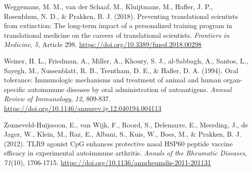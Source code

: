 \documentclass[authordate, editorial, issue]{jote-new-article}
\begin{document}
	Weggemans, M. M., van der Schaaf, M., Kluijtmans, M., Hafler, J. P., Rosenblum, N. D., \& Prakken, B. J. (2018). Preventing translational scientists from extinction: The long-term impact of a personalized training program in translational medicine on the careers of translational scientists. \emph{Frontiers in Medicine},\emph{ 5}, Article 298. \url{https://doi.org/10.3389/fmed.2018.00298}



	Weiner, H. L., Friedman, A., Miller, A., Khoury, S. J., al-Sabbagh, A., Santos, L., Sayegh, M., Nussenblatt, R. B., Trentham, D. E., \& Hafler, D. A. (1994). Oral tolerance: Immunologic mechanisms and treatment of animal and human organ-specific autoimmune diseases by oral administration of autoantigens. \emph{Annual Review of Immunology},\emph{ 12}, 809-837. \url{https://doi.org/10.1146/annurev.iy.12.040194.004113}



	Zonneveld-Huijssoon, E., van Wijk, F., Roord, S., Delemarre, E., Meerding, J., de Jager, W., Klein, M., Raz, E., Albani, S., Kuis, W., Boes, M., \& Prakken, B. J. (2012). TLR9 agonist CpG enhances protective nasal HSP60 peptide vaccine efficacy in experimental autoimmune arthritis. \emph{Annals of the Rheumatic Diseases},\emph{ 71}(10), 1706-1715. \url{https://doi.org/10.1136/annrheumdis-2011-201131}
\end{document}
